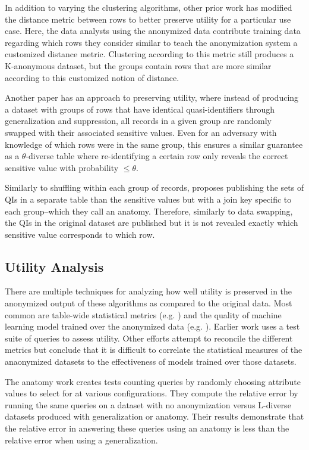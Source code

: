 In addition to varying the clustering algorithms, other prior work has modified the distance metric between rows to better preserve utility for a particular use case\cite{jiaPad}. Here, the data analysts using the anonymized data contribute training data regarding which rows they consider similar to teach the anonymization system a customized distance metric. Clustering according to this metric still produces a K-anonymous dataset, but the groups contain rows that are more similar according to this customized notion of distance.

Another paper\cite{soriaSwapping} has an approach to preserving utility, where instead of producing a dataset with groups of rows that have identical quasi-identifiers through generalization and suppression, all records in a given group are randomly swapped with their associated sensitive values. Even for an adversary with knowledge of which rows were in the same group, this ensures a similar guarantee as a $\theta$-diverse table where re-identifying a certain row only reveals the correct sensitive value with probability $\leq\theta$. 

Similarly to shuffling within each group of records, \cite{xiaoAnatomy} proposes publishing the sets of QIs in a separate table than the sensitive values but with a join key specific to each group--which they call an anatomy. Therefore, similarly to data swapping\cite{soriaSwapping}, the QIs in the original dataset are published but it is not revealed exactly which sensitive value corresponds to which row.

\subsection{Utility Analysis}
There are multiple techniques for analyzing how well utility is preserved in the anonymized output of these algorithms as compared to the original data. Most common are table-wide statistical metrics (e.g. \cite{soriaSwapping}) and the quality of machine learning model trained over the anonymized data (e.g. \cite{sangogboyePad}). Earlier work\cite{xiaoAnatomy} uses a test suite of queries to assess utility. Other efforts attempt to reconcile the different metrics but conclude that it is difficult to correlate the statistical measures of the anaonymized datasets to the effectiveness of models trained over those datasets\cite{vsarvcevicEffectiveness}.

The anatomy work\cite{xiaoAnatomy} creates tests counting queries by randomly choosing attribute values to select for at various configurations. They compute the relative error by running the same queries on a dataset with no anonymization versus L-diverse datasets produced with generalization or anatomy. Their results demonstrate that the relative error in answering these queries using an anatomy is less than the relative error when using a generalization.

